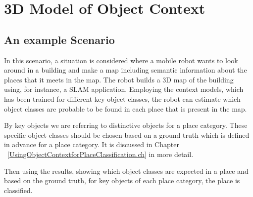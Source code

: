 \chapter{3D Model of Object Context}
\label{3DModelofObjectContext.ch}
\section{An example Scenario}
\label{Scenario.sec}

In this scenario, a situation is considered where a mobile robot wants to look around in a building and make a map including semantic information about the 
places that it meets in the map. 
The robot builds a 3D map of the building using, for instance, a SLAM application. 
Employing the context models, which has been trained for different key object classes, the robot can estimate which object classes 
are probable to be found in each place that is present in the map. 

By key objects we are referring to distinctive objects for a place category. These specific object classes should be chosen based on 
a ground truth which is defined in advance for a place category. It is discussed in Chapter ~\ref{UsingObjectContextforPlaceClassification.ch}
in more detail.

Then using the results, showing which object classes are expected in a place and based on the ground truth, for key objects of each place
category, the place is classified. 

% 

